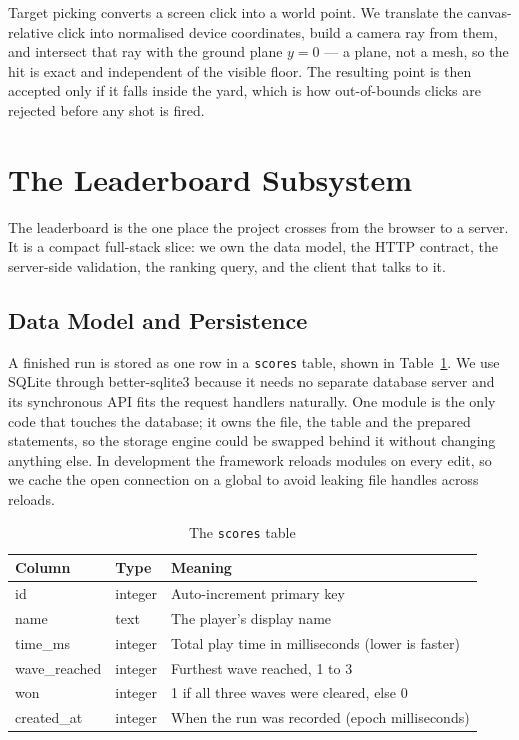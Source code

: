 \documentclass[12pt,a4paper]{report}
\begin{document}
Target picking converts a screen click into a world point. We translate the
canvas-relative click into normalised device coordinates, build a camera ray
from them, and intersect that ray with the ground plane $y=0$ --- a plane, not a
mesh, so the hit is exact and independent of the visible floor. The resulting
point is then accepted only if it falls inside the yard, which is how
out-of-bounds clicks are rejected before any shot is fired.

\section{The Leaderboard Subsystem}

The leaderboard is the one place the project crosses from the browser to a
server. It is a compact full-stack slice: we own the data model, the HTTP
contract, the server-side validation, the ranking query, and the client that
talks to it.

\subsection{Data Model and Persistence}

A finished run is stored as one row in a \texttt{scores} table, shown in
Table~\ref{tab:schema}. We use SQLite through better-sqlite3 because it needs no
separate database server and its synchronous API fits the request handlers
naturally. One module is the only code that touches the database; it owns the
file, the table and the prepared statements, so the storage engine could be
swapped behind it without changing anything else. In development the framework
reloads modules on every edit, so we cache the open connection on a global to
avoid leaking file handles across reloads.

\begin{table}[htbp]
\centering
\caption{The \texttt{scores} table}
\label{tab:schema}
\begin{tabular}{|p{3.4cm}|p{2.6cm}|p{6.0cm}|}
\hline
Column & Type & Meaning \\
\hline
id & integer & Auto-increment primary key \\
\hline
name & text & The player's display name \\
\hline
time\_ms & integer & Total play time in milliseconds (lower is faster) \\
\hline
wave\_reached & integer & Furthest wave reached, 1 to 3 \\
\hline
won & integer & 1 if all three waves were cleared, else 0 \\
\hline
created\_at & integer & When the run was recorded (epoch milliseconds) \\
\hline
\end{tabular}
\end{table}
\end{document}
